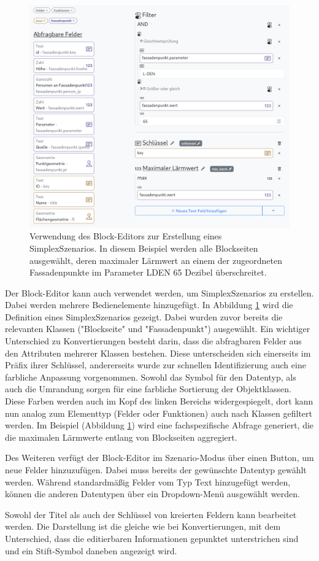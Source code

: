 \begin{figure}[ht]
  \begin{center}
    \includegraphics[width=.95\textwidth]{assets/lpz-scenario.png}
  \end{center}
  \caption{Verwendung des Block-Editors zur Erstellung eines SimplexSzenarios. In diesem Beispiel werden alle Blockseiten ausgewählt, deren maximaler Lärmwert an einem der zugeordneten Fassadenpunkte im Parameter \acf{LDEN} 65 Dezibel überschreitet.}
  \label{fig:buffet-scenario}
\end{figure}

Der Block-Editor kann auch verwendet werden, um SimplexSzenarios zu erstellen. Dabei werden mehrere Bedienelemente hinzugefügt. In Abbildung \ref{fig:buffet-scenario} wird die Definition eines SimplexSzenarios gezeigt. Dabei wurden zuvor bereits die relevanten Klassen ("Blockseite" und "Fassadenpunkt") ausgewählt. Ein wichtiger Unterschied zu Konvertierungen besteht darin, dass die abfragbaren Felder aus den Attributen mehrerer Klassen bestehen. Diese unterscheiden sich einerseits im Präfix ihrer Schlüssel, andererseits wurde zur schnellen Identifizierung auch eine farbliche Anpassung vorgenommen. Sowohl das Symbol für den Datentyp, als auch die Umrandung sorgen für eine farbliche Sortierung der Objektklassen. Diese Farben werden auch im Kopf des linken Bereichs widergespiegelt, dort kann nun analog zum Elementtyp (Felder oder Funktionen) auch nach Klassen gefiltert werden. Im Beispiel (Abbildung \ref{fig:buffet-scenario}) wird eine fachspezifische Abfrage generiert, die die maximalen Lärmwerte entlang von Blockseiten aggregiert.

Des Weiteren verfügt der Block-Editor im Szenario-Modus über einen Button, um neue Felder hinzuzufügen. Dabei muss bereits der gewünschte Datentyp gewählt werden. Während standardmäßig Felder vom Typ Text hinzugefügt werden, können die anderen Datentypen über ein Dropdown-Menü ausgewählt werden.

Sowohl der Titel als auch der Schlüssel von kreierten Feldern kann bearbeitet werden. Die Darstellung ist die gleiche wie bei Konvertierungen, mit dem Unterschied, dass die editierbaren Informationen gepunktet unterstrichen sind und ein Stift-Symbol daneben angezeigt wird.
